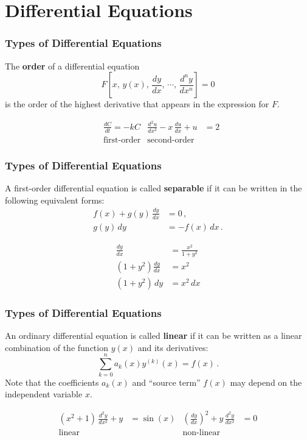 \documentclass[xcolor=table]{beamer}
\begin{document}
	\section{Differential Equations}
	\begin{frame}
		\frametitle{Types of Differential Equations}
		\begin{definition}
			The \textbf{order} of a differential equation $$F\left[x,\,y(x),\,\frac{dy}{dx},\,\cdots,\,\frac{d^ny}{dx^n}\right]=0$$ is the order of the highest derivative that appears in the expression for $F$.
		\end{definition}
		\begin{example}
			\begin{align*}
				& \frac{dC}{dt}=-kC &  \frac{d^2u}{dx^2}-x\,\frac{du}{dx}+u &=2\\
				& \text{first-order} & \text{second-order} &
			\end{align*}
		\end{example}
	\end{frame}

	\begin{frame}
		\frametitle{Types of Differential Equations}
		\begin{definition}
			A first-order differential equation is called \textbf{separable} if it can be written in the following equivalent forms:
			\begin{align*}
				f(x)+g(y)\,\frac{dy}{dx} & =0\,,\\
				g(y)\,dy & =-f(x)\,dx\,.
			\end{align*}
		\end{definition}
		\begin{example}
			\begin{align*}
				\frac{dy}{dx} & =\frac{x^2}{1+y^2}\\
				(1+y^2)\frac{dy}{dx} & =x^2\\
				(1+y^2)\,dy & =x^2\,dx
			\end{align*}
		\end{example}
	\end{frame}
	
	\begin{frame}
		\frametitle{Types of Differential Equations}
		\begin{definition}
			An ordinary differential equation is called \textbf{linear} if it can be written as a linear combination of the function $y(x)$ and its derivatives: $$\sum_{k=0}^na_k(x)y^{(k)}(x)=f(x)\,.$$ Note that the coefficients $a_k(x)$ and ``source term'' $f(x)$ may depend on the independent variable $x$.
		\end{definition}
		\begin{example}
			\begin{align*}
				(x^2+1)\,\frac{d^2y}{dx^2}+y & =\sin(x) &  \left(\frac{dy}{dx}\right)^2+y\,\frac{d^2y}{dx^2} & =0\\
				\text{linear} & & \text{non-linear} &
			\end{align*}
		\end{example}
	\end{frame}
	
\end{document}
